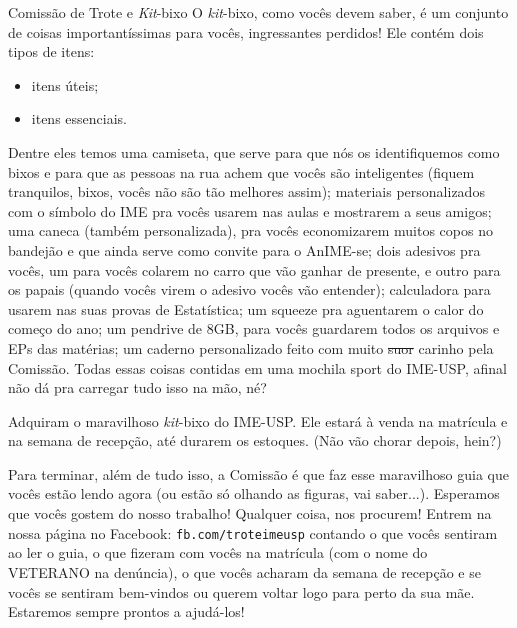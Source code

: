 \begin{secao}{Comissão de Trote e \textit{Kit}-bixo}
O \textit{kit}-bixo, como vocês devem saber, é um conjunto de coisas
importantíssimas para vocês, ingressantes perdidos! Ele contém dois tipos de
itens:
\begin{itemize}
\item itens úteis;
\item itens essenciais.
\end{itemize} %
Dentre eles temos uma camiseta, que serve para que nós os identifiquemos como
bixos e para que as pessoas na rua achem que vocês são inteligentes (fiquem
tranquilos, bixos, vocês não são tão melhores assim); materiais personalizados
com o símbolo do IME pra vocês usarem nas aulas e mostrarem a seus amigos; uma
caneca (também personalizada), pra vocês economizarem muitos copos no bandejão e
que ainda serve como convite para o AnIME-se; dois adesivos pra vocês, um para
vocês colarem no carro que vão ganhar de presente, e outro para os papais
(quando vocês virem o adesivo vocês vão entender); calculadora para usarem nas
suas provas de Estatística; um squeeze pra aguentarem o calor do começo do ano;
um pendrive de 8GB, para vocês guardarem todos os arquivos e EPs das matérias; 
um caderno personalizado feito com muito \sout{suor} carinho pela Comissão.
Todas essas coisas contidas em uma mochila sport do IME-USP, afinal não dá pra
carregar tudo isso na mão, né?

Adquiram o maravilhoso \textit{kit}-bixo do IME-USP. Ele estará à venda na
matrícula e na semana de recepção, até durarem os estoques. (Não vão chorar
depois, hein?)

Para terminar, além de tudo isso, a Comissão é que faz esse maravilhoso guia que
vocês estão lendo agora (ou estão só olhando as figuras, vai
saber...). Esperamos que vocês gostem do nosso trabalho! Qualquer coisa, nos
procurem! Entrem na nossa página no Facebook: {\tt fb.com/troteimeusp} contando o
que vocês sentiram ao ler o guia, o que fizeram com vocês na matrícula (com o
nome do VETERANO na denúncia), o que vocês acharam da semana de recepção e se
vocês se sentiram bem-vindos ou querem voltar logo para perto da sua
mãe. Estaremos sempre prontos a ajudá-los!
\end{secao}
